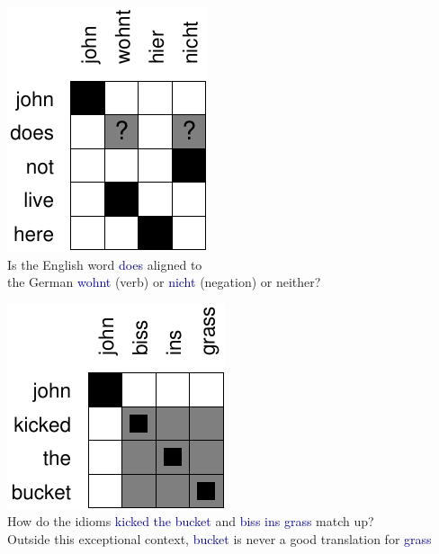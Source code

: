 \documentclass[landscape]{slides}
\newcommand{\example}[1]{\textcolor{darkblue}{\rm #1}}
\begin{document}
\vspace{10mm}
\begin{center}
\includegraphics[scale=2]{does-not-alignment.pdf}\\[10mm]
Is the English word \example{does} aligned to\\ the German \example{wohnt} (verb) or \example{nicht} (negation) or neither?
\end{center}


\vspace{10mm}
\begin{center}
\includegraphics[scale=2]{kicked-the-bucket-alignment.pdf}\\[10mm]
How do the idioms \example{kicked the bucket} and \example{biss ins grass} match up?\\ Outside this exceptional context, \example{bucket} is never a good translation for \example{grass}
\end{center}

\end{document}
